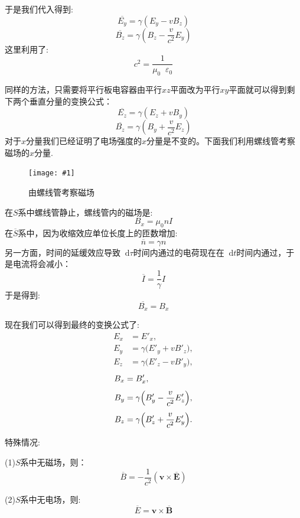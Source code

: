 \documentclass[12pt,a4paper,oneside]{report}
\theoremstyle{definition}
\theoremstyle{remark}
\newcommand{\insertfig}[3]{
    \begin{figure}[ht]
        \centering
        \texttt{[image: \#1]}
        \caption{#2}
        \label{fig:#1}
    \end{figure}
}
\newcommand{\mb}[1]{\mathbf{#1}}
\renewcommand{\d}{\mathop{}\!\mathrm{d}}
\renewcommand{\v}{\mathop{}\!\varepsilon}
\begin{document}
于是我们代入得到:
\[
\overline{E_y} = \gamma(E_y-vB_z)
\]
\[
\overline{B_z} = \gamma(B_z-\frac{v}{c^2}E_y)
\]
这里利用了:
\[
c^2 = \frac{1}{\mu_0\v_0}
\]

同样的方法，只需要将平行板电容器由平行$xz$平面改为平行$xy$平面就可以得到剩下两个垂直分量的变换公式：
\[
\overline{E_z} = \gamma(E_z+vB_y)
\]
\[
\overline{B_z} = \gamma(B_y+\frac{v}{c^2}E_z)
\]
对于$x$分量我们已经证明了电场强度的$x$分量是不变的。下面我们利用螺线管考察磁场的$x$分量.
\insertfig{5-10.png}{由螺线管考察磁场}{0.5}

在$S$系中螺线管静止，螺线管内的磁场是:
\[
B_x = \mu_0 nI
\]
在$\overline{S}$系中，因为收缩效应单位长度上的匝数增加:
\[
\overline{n} = \gamma n
\]
另一方面，时间的延缓效应导致$\d \tau$时间内通过的电荷现在在$\d t$时间内通过，于是电流将会减小：
\[
\overline{I} = \frac{1}{\gamma}I
\]
于是得到:
\[
\overline{B_x} = B_x
\]

现在我们可以得到最终的变换公式了:
\begin{align*}
E_x &= E'_x,\\[4pt]
E_y &= \gamma\bigl(E'_y + v B'_z\bigr),\\[4pt]
E_z &= \gamma\bigl(E'_z - v B'_y\bigr),
\end{align*}
\begin{align*}
B_x &= B'_x,\\[4pt]
B_y &= \gamma\Bigl(B'_y - \frac{v}{c^2}E'_z\Bigr),\\[4pt]
B_z &= \gamma\Bigl(B'_z + \frac{v}{c^2}E'_y\Bigr).
\end{align*}

特殊情况:

(1)$S$系中无磁场，则：
\[
\overline{B} = -\frac{1}{c^2}(\mb{v}\times \overline{\mb{E}})
\]

(2)$S$系中无电场，则:
\[
\overline{E} = \mb{v}\times\overline{\mb{B}}
\]
\end{document}
